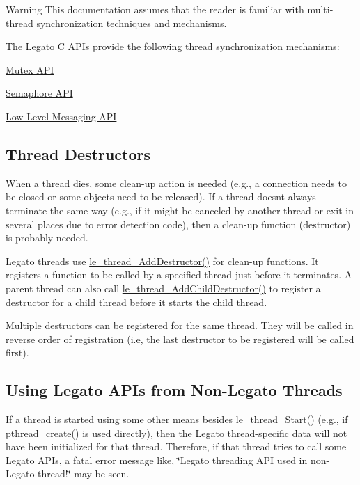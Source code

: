 \begin{DoxyWarning}{Warning}
This documentation assumes that the reader is familiar with multi-\/thread synchronization techniques and mechanisms.
\end{DoxyWarning}
The Legato C A\+P\+Is provide the following thread synchronization mechanisms\+:
\begin{DoxyItemize}
\item \hyperlink{c_mutex}{Mutex A\+P\+I}
\item \hyperlink{c_semaphore}{Semaphore A\+P\+I}
\item \hyperlink{c_messaging}{Low-\/\+Level Messaging A\+P\+I}
\end{DoxyItemize}\hypertarget{c_threading_threadDestructors}{}\subsection{Thread Destructors}\label{c_threading_threadDestructors}
When a thread dies, some clean-\/up action is needed (e.\+g., a connection needs to be closed or some objects need to be released). If a thread doesn\textquotesingle{}t always terminate the same way (e.\+g., if it might be canceled by another thread or exit in several places due to error detection code), then a clean-\/up function (destructor) is probably needed.

Legato threads use {\ttfamily \hyperlink{le__thread_8h_aa85ee32cc06f219f3c619104f4d97932}{le\+\_\+thread\+\_\+\+Add\+Destructor()}} for clean-\/up functions. It registers a function to be called by a specified thread just before it terminates. A parent thread can also call {\ttfamily \hyperlink{le__thread_8h_a671dbe2927a3b2a13c5150476398f34f}{le\+\_\+thread\+\_\+\+Add\+Child\+Destructor()}} to register a destructor for a child thread before it starts the child thread.

Multiple destructors can be registered for the same thread. They will be called in reverse order of registration (i.\+e, the last destructor to be registered will be called first).\hypertarget{c_threading_threadLegatoizing}{}\subsection{Using Legato A\+P\+Is from Non-\/\+Legato Threads}\label{c_threading_threadLegatoizing}
If a thread is started using some other means besides \hyperlink{le__thread_8h_a38df3877ee5ab9fac17b2fc0be46c27e}{le\+\_\+thread\+\_\+\+Start()} (e.\+g., if pthread\+\_\+create() is used directly), then the Legato thread-\/specific data will not have been initialized for that thread. Therefore, if that thread tries to call some Legato A\+P\+Is, a fatal error message like, \char`\"{}\+Legato threading A\+P\+I used in non-\/\+Legato thread!\char`\"{} may be seen.


